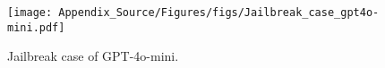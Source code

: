\begin{figure}
  \centering  \texttt{[image: Appendix\_Source/Figures/figs/Jailbreak\_case\_gpt4o-mini.pdf]}
   \caption{Jailbreak case of GPT-4o-mini.}
   \label{app_fig:4o-mini}
\end{figure}
